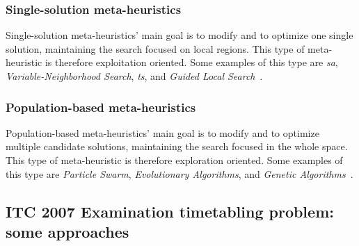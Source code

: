\subsubsection{Single-solution meta-heuristics}
Single-solution meta-heuristics' main goal is to modify and to optimize one single solution, maintaining the search focused on local regions. This type of meta-heuristic is therefore exploitation oriented. Some examples of this type are \textit{\gls{sa}}, \textit{Variable-Neighborhood Search}, \textit{\gls{ts}}, and \textit{Guided Local Search}~\cite{Talbi2009}. \\

\subsubsection{Population-based meta-heuristics}
Population-based meta-heuristics' main goal is to modify and to optimize multiple candidate solutions, maintaining the search focused in the whole space. This type of meta-heuristic is therefore exploration oriented. Some examples of this type are \textit{Particle Swarm}, \textit{Evolutionary Algorithms}, and \textit{Genetic Algorithms}~\cite{Talbi2009}.\\


\subsection{ITC 2007 Examination timetabling problem: some approaches}
\label{subsection:ApprITC2007}

